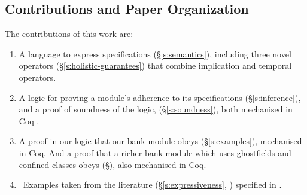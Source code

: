  
 
  
\subsection{Contributions and Paper Organization}


%
The contributions of this {work} are:
\begin{enumerate}
\item   A language to express \Nec specifications (\S\ref{s:semantics}), including three novel \Nec operators (\S\ref{s:holistic-guarantees}) that combine implication and temporal operators.  

 \item
A logic for proving a module's adherence to its
 \Nec specifications (\S\ref{s:inference}), and a proof of soundness of the logic, (\S\ref{s:soundness}),
both mechanised in Coq . 
 \item
A proof in our logic %
  that our bank module {obeys} %
  \SrobustB (\S\ref{s:examples}),     mechanised in Coq.
  And a proof that
  a richer bank module which uses ghostfields and confined classes  obeys  \SrobustB (\S{}),
  also mechanised in Coq.
\item \ {Examples taken from the literature  (\S\ref{s:expressiveness}, ) specified in \Nec .}

\end{enumerate}




